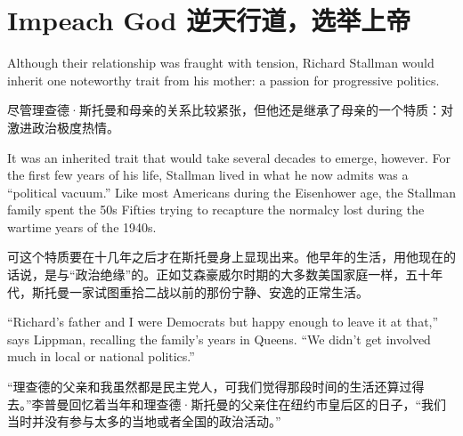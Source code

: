 
\chapter{\ifdefined\eng
Impeach God
\fi
\ifdefined\chs
逆天行道，选举上帝
\fi}

\ifdefined\eng
Although their relationship was fraught with tension, Richard Stallman would inherit one noteworthy trait from his mother: a passion for progressive politics.
\fi

\ifdefined\chs
尽管理查德·斯托曼和母亲的关系比较紧张，但他还是继承了母亲的一个特质：对激进政治极度热情。
\fi

\ifdefined\eng
It was an inherited trait that would take several decades to emerge, however. For the first few years of his life, Stallman lived in what he now admits was a ``political vacuum.'' Like most Americans during the Eisenhower age, the Stallman family spent the \ifdefined\vone 50s \fi\ifdefined\vtwo Fifties \fi trying to recapture the normalcy lost during the wartime years of the 1940s.
\fi

\ifdefined\chs
可这个特质要在十几年之后才在斯托曼身上显现出来。他早年的生活，用他现在的话说，是与``政治绝缘''的。正如艾森豪威尔时期的大多数美国家庭一样，五十年代，斯托曼一家试图重拾二战以前的那份宁静、安逸的正常生活。
\fi

\ifdefined\eng
``Richard's father and I were Democrats but happy enough to leave it at that,'' says Lippman, recalling the family's years in Queens. ``We didn't get involved much in local or national politics.''
\fi

\ifdefined\chs
``理查德的父亲和我虽然都是民主党人，可我们觉得那段时间的生活还算过得去。''李普曼回忆着当年和理查德·斯托曼的父亲住在纽约市皇后区的日子，``我们当时并没有参与太多的当地或者全国的政治活动。''
\fi


